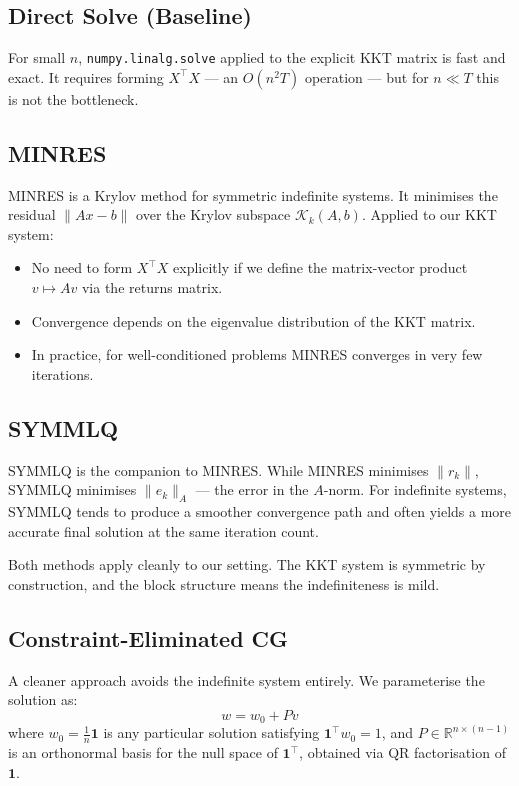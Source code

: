 \documentclass[11pt, a4paper]{article}
\begin{document}
\subsection{Direct Solve (Baseline)}

For small $n$, \texttt{numpy.linalg.solve} applied to the explicit KKT matrix is fast and exact. It requires forming $X^\top X$ — an $O(n^2 T)$ operation — but for $n \ll T$ this is not the bottleneck.

\subsection{MINRES}

MINRES \cite{paige1975} is a Krylov method for symmetric indefinite systems. It minimises the residual $\|Ax - b\|$ over the Krylov subspace $\mathcal{K}_k(A, b)$. Applied to our KKT system:
\begin{itemize}
  \item No need to form $X^\top X$ explicitly if we define the matrix-vector product $v \mapsto Av$ via the returns matrix.
  \item Convergence depends on the eigenvalue distribution of the KKT matrix.
  \item In practice, for well-conditioned problems MINRES converges in very few iterations.
\end{itemize}

\subsection{SYMMLQ}

SYMMLQ \cite{paige1975} is the companion to MINRES. While MINRES minimises $\|r_k\|$, SYMMLQ minimises $\|e_k\|_A$ — the error in the $A$-norm. For indefinite systems, SYMMLQ tends to produce a smoother convergence path and often yields a more accurate final solution at the same iteration count.

Both methods apply cleanly to our setting. The KKT system is symmetric by construction, and the block structure means the indefiniteness is mild.

\subsection{Constraint-Eliminated CG}

A cleaner approach avoids the indefinite system entirely. We parameterise the solution as:
\[
w = w_0 + Pv
\]
where $w_0 = \frac{1}{n}\mathbf{1}$ is any particular solution satisfying $\mathbf{1}^\top w_0 = 1$, and $P \in \mathbb{R}^{n \times (n-1)}$ is an orthonormal basis for the null space of $\mathbf{1}^\top$, obtained via QR factorisation of $\mathbf{1}$.
\end{document}
